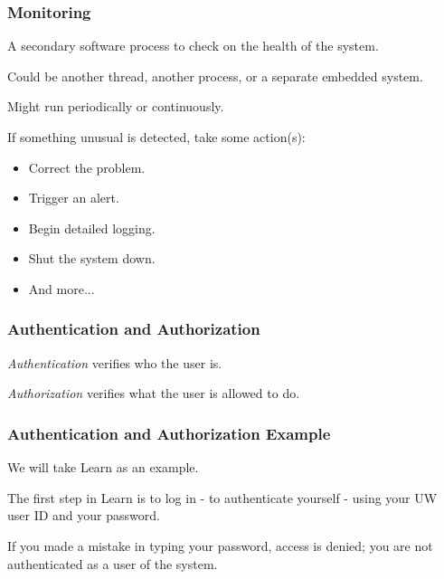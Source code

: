 \begin{frame}
\frametitle{Monitoring}
\begin{changemargin}{1cm}

A secondary software process to check on the health of the system.

Could be another thread, another process, or a separate embedded system.

Might run periodically or continuously.

If something unusual is detected, take some action(s):
\begin{itemize}
	\item Correct the problem.
	\item Trigger an alert.
	\item Begin detailed logging.
	\item Shut the system down.
	\item And more...
\end{itemize}

\end{changemargin}
\end{frame}

\begin{frame}
\frametitle{Authentication and Authorization}
\begin{changemargin}{1cm}

\textit{Authentication} verifies who the user is. 

\textit{Authorization} verifies what the user is allowed to do. 

\end{changemargin}
\end{frame}


\begin{frame}
\frametitle{Authentication and Authorization Example}
\begin{changemargin}{1cm}

We will take Learn as an example. 

The first step in Learn is to log in - to authenticate yourself - using your UW user ID and your password. 

If you made a mistake in typing your password, access is denied; you are not authenticated as a user of the system. 

\end{changemargin}
\end{frame}

